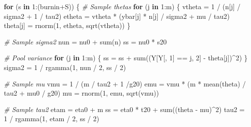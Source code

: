 \documentclass[
  11pt,
]{article}
\newenvironment{Shaded}{\begin{snugshade}}{\end{snugshade}}
\newcommand{\CommentTok}[1]{\textcolor[rgb]{0.56,0.35,0.01}{\textit{#1}}}
\newcommand{\ControlFlowTok}[1]{\textcolor[rgb]{0.13,0.29,0.53}{\textbf{#1}}}
\newcommand{\DecValTok}[1]{\textcolor[rgb]{0.00,0.00,0.81}{#1}}
\newcommand{\FunctionTok}[1]{\textcolor[rgb]{0.00,0.00,0.00}{#1}}
\newcommand{\NormalTok}[1]{#1}
\newcommand{\OtherTok}[1]{\textcolor[rgb]{0.56,0.35,0.01}{#1}}
\newcommand{\SpecialCharTok}[1]{\textcolor[rgb]{0.00,0.00,0.00}{#1}}
\begin{document}
\begin{Shaded}
\begin{Highlighting}[]
\ControlFlowTok{for}\NormalTok{ (s }\ControlFlowTok{in} \DecValTok{1}\SpecialCharTok{:}\NormalTok{(burnin}\SpecialCharTok{+}\NormalTok{S)) \{}
  \CommentTok{\# Sample thetas}
  \ControlFlowTok{for}\NormalTok{ (j }\ControlFlowTok{in} \DecValTok{1}\SpecialCharTok{:}\NormalTok{m) \{}
\NormalTok{    vtheta }\OtherTok{=} \DecValTok{1} \SpecialCharTok{/}\NormalTok{ (n[j] }\SpecialCharTok{/}\NormalTok{ sigma2 }\SpecialCharTok{+} \DecValTok{1} \SpecialCharTok{/}\NormalTok{ tau2)}
\NormalTok{    etheta }\OtherTok{=}\NormalTok{ vtheta }\SpecialCharTok{*}\NormalTok{ (ybar[j] }\SpecialCharTok{*}\NormalTok{ n[j] }\SpecialCharTok{/}\NormalTok{ sigma2 }\SpecialCharTok{+}\NormalTok{ mu }\SpecialCharTok{/}\NormalTok{ tau2)}
\NormalTok{    theta[j] }\OtherTok{=} \FunctionTok{rnorm}\NormalTok{(}\DecValTok{1}\NormalTok{, etheta, }\FunctionTok{sqrt}\NormalTok{(vtheta))}
\NormalTok{  \}}
  
  \CommentTok{\# Sample sigma2}
\NormalTok{  nun }\OtherTok{=}\NormalTok{ nu0 }\SpecialCharTok{+} \FunctionTok{sum}\NormalTok{(n)}
\NormalTok{  ss }\OtherTok{=}\NormalTok{ nu0 }\SpecialCharTok{*}\NormalTok{ s20}
  
  \CommentTok{\# Pool variance}
  \ControlFlowTok{for}\NormalTok{ (j }\ControlFlowTok{in} \DecValTok{1}\SpecialCharTok{:}\NormalTok{m) \{}
\NormalTok{    ss }\OtherTok{=}\NormalTok{ ss }\SpecialCharTok{+} \FunctionTok{sum}\NormalTok{((Y[Y[, }\DecValTok{1}\NormalTok{] }\SpecialCharTok{==}\NormalTok{ j, }\DecValTok{2}\NormalTok{] }\SpecialCharTok{{-}}\NormalTok{ theta[j])}\SpecialCharTok{\^{}}\DecValTok{2}\NormalTok{)}
\NormalTok{  \}}
\NormalTok{  sigma2 }\OtherTok{=} \DecValTok{1} \SpecialCharTok{/} \FunctionTok{rgamma}\NormalTok{(}\DecValTok{1}\NormalTok{, nun }\SpecialCharTok{/} \DecValTok{2}\NormalTok{, ss }\SpecialCharTok{/} \DecValTok{2}\NormalTok{)}
  
  \CommentTok{\# Sample mu}
\NormalTok{  vmu }\OtherTok{=} \DecValTok{1} \SpecialCharTok{/}\NormalTok{ (m }\SpecialCharTok{/}\NormalTok{ tau2 }\SpecialCharTok{+} \DecValTok{1} \SpecialCharTok{/}\NormalTok{g20)}
\NormalTok{  emu }\OtherTok{=}\NormalTok{ vmu }\SpecialCharTok{*}\NormalTok{ (m }\SpecialCharTok{*} \FunctionTok{mean}\NormalTok{(theta) }\SpecialCharTok{/}\NormalTok{ tau2 }\SpecialCharTok{+}\NormalTok{ mu0 }\SpecialCharTok{/}\NormalTok{ g20)}
\NormalTok{  mu }\OtherTok{=} \FunctionTok{rnorm}\NormalTok{(}\DecValTok{1}\NormalTok{, emu, }\FunctionTok{sqrt}\NormalTok{(vmu))}
  
  \CommentTok{\# Sample tau2}
\NormalTok{  etam }\OtherTok{=}\NormalTok{ eta0 }\SpecialCharTok{+}\NormalTok{ m}
\NormalTok{  ss }\OtherTok{=}\NormalTok{ eta0 }\SpecialCharTok{*}\NormalTok{ t20 }\SpecialCharTok{+} \FunctionTok{sum}\NormalTok{((theta }\SpecialCharTok{{-}}\NormalTok{ mu)}\SpecialCharTok{\^{}}\DecValTok{2}\NormalTok{)}
\NormalTok{  tau2 }\OtherTok{=} \DecValTok{1} \SpecialCharTok{/} \FunctionTok{rgamma}\NormalTok{(}\DecValTok{1}\NormalTok{, etam }\SpecialCharTok{/} \DecValTok{2}\NormalTok{, ss }\SpecialCharTok{/} \DecValTok{2}\NormalTok{)}
  

\end{Highlighting}
\end{Shaded}
\end{document}
